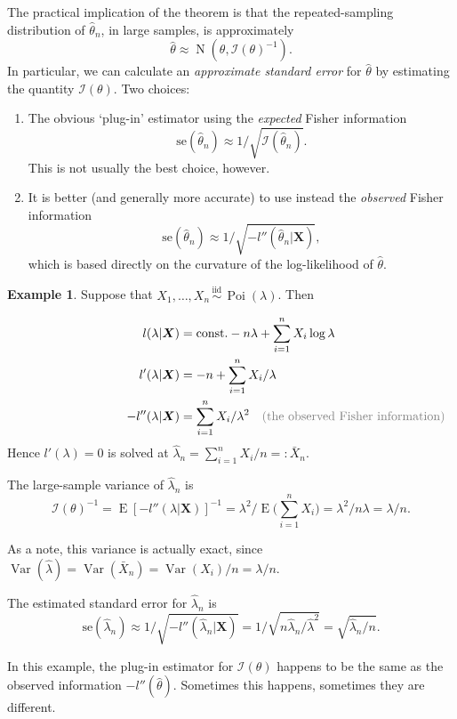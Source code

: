 \documentclass[
]{book}
\newcommand{\bX}{{\boldsymbol X}}
\DeclareMathOperator{\E}{E}
\DeclareMathOperator{\Var}{Var}
\DeclareMathOperator{\N}{N}
\DeclareMathOperator{\Pois}{Poi}
\newcommand{\iid}{\,\overset{\text{iid}}{\sim}\,}
\newcommand{\cI}{{\mathcal I}}
\newcommand{\const}{\text{const.}}
\newcommand{\mycomment}[2][10pt]{\hspace{#1}\rlap{\color{gray}\text{#2}}}
\theoremstyle{definition}
\theoremstyle{definition}
\newtheorem{example}{Example}[chapter]
\theoremstyle{definition}
\theoremstyle{definition}
\theoremstyle{remark}
\begin{document}
The practical implication of the theorem is that the repeated-sampling distribution of \(\hat\theta_n\), in large samples, is approximately
\[
\hat\theta \approx \N\left(\theta, \cI(\theta)^{-1} \right).
\]
In particular, we can calculate an \emph{approximate standard error} for \(\hat\theta\) by estimating the quantity \(\cI(\theta)\). Two choices:

\begin{enumerate}
\def\labelenumi{\arabic{enumi}.}
\item
  The obvious `plug-in' estimator using the \emph{expected} Fisher information
  \[
  \text{se}(\hat\theta_n) \approx 1\Big/\sqrt{\cI(\hat\theta_n)}.
  \]
  This is not usually the best choice, however.
\item
  It is better (and generally more accurate) to use instead the \emph{observed} Fisher information
  \[
  \text{se}(\hat\theta_n) \approx 1\Big/\sqrt{-l''(\hat\theta_n|\bX)},
  \]
  which is based directly on the curvature of the log-likelihood of \(\hat\theta\).
\end{enumerate}

\begin{example}
Suppose that \(X_1,\dots,X_n\iid\Pois(\lambda)\). Then

\begin{align*}
l(\lambda|\bX) &= \const - n\lambda +\sum_{i=1}^n X_i \log \lambda \\
l'(\lambda|\bX) &= - n +\sum_{i=1}^n X_i / \lambda \\ 
-l''(\lambda|\bX) &=  \sum_{i=1}^n X_i / \lambda^2 \mycomment{(the observed Fisher information)}
\end{align*}
Hence \(l'(\lambda)=0\) is solved at \(\hat\lambda_n = \sum_{i=1}^n X_i / n =: \bar X_n\).

The large-sample variance of \(\hat\lambda_n\) is
\[
\cI(\theta)^{-1} = \E\left[-l''(\lambda|\bX) \right]^{-1} = \lambda^2 \big/ \E\bigg(\sum_{i=1}^n X_i\bigg) = \lambda^2 / n\lambda = \lambda /n.
\]

As a note, this variance is actually exact, since \(\Var(\hat\lambda)=\Var(\bar X_n)=\Var(X_i)/n=\lambda/n\).

The estimated standard error for \(\hat\lambda_n\) is
\[
\text{se}(\hat\lambda_n) \approx 1\Big/\sqrt{-l''(\hat\lambda_n|\bX)} = 1\Big/\sqrt{n\hat\lambda_n/\hat\lambda^2} = \sqrt{\hat\lambda_n/n}.
\]
\end{example}

In this example, the plug-in estimator for \(\cI(\theta)\) happens to be the same as the observed information \(-l''(\hat\theta)\). Sometimes this happens, sometimes they are different.
\end{document}
